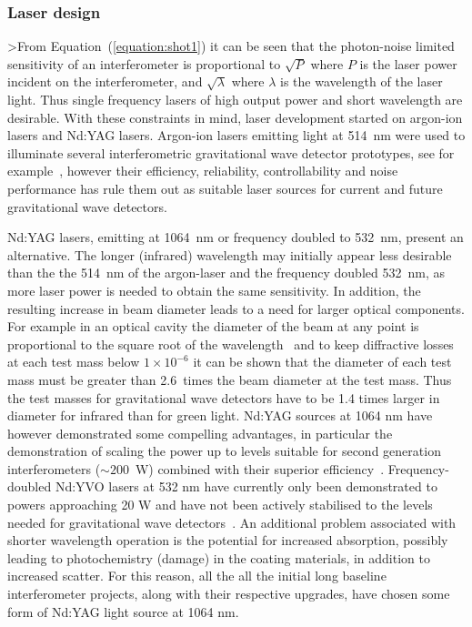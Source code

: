 \documentclass{article}
\begin{document}

\subsubsection{Laser design}
\label{subsubsection:laserdesign}

>From Equation~(\ref{equation:shot1}) it can be seen that the photon-noise
limited sensitivity of an interferometer is proportional to $\sqrt{P}$ where $P$
is the laser power incident on the interferometer, and $\sqrt{\lambda}$ where
$\lambda$ is the wavelength of the laser light. Thus single frequency lasers of
high output power and short wavelength are desirable. With these constraints in
mind, laser development started on argon-ion lasers and Nd:YAG lasers.
Argon-ion lasers emitting light at 514~nm were used to illuminate several
interferometric gravitational wave detector prototypes, see for
example~\cite{Shoemaker, Robertson}, however their efficiency, reliability,
controllability and noise performance has rule them out as suitable laser
sources for current and future gravitational wave detectors.

Nd:YAG lasers, emitting at 1064~nm or frequency doubled to 532~nm, present an
alternative. The longer (infrared) wavelength may initially appear less
desirable than the the 514~nm of the argon-laser and the frequency doubled
532~nm, as more laser power is needed to obtain the same sensitivity.  In
addition, the resulting increase in beam diameter leads to a need for larger
optical components. For example in an optical cavity the diameter of the beam at
any point is proportional to the square root of the wavelength~\cite{Kogelnik}
and to keep diffractive losses at each test mass below $1 \times 10^{-6}$ it can
be shown that the diameter of each test mass must be greater than 2.6~times the
beam diameter at the test mass. Thus the test masses for gravitational wave
detectors have to be 1.4 times larger in diameter for infrared than for green
light. Nd:YAG sources at 1064 nm have however demonstrated some compelling
advantages, in particular the demonstration of scaling the power up to levels
suitable for second generation interferometers ($\sim200$~W) combined with their
superior efficiency~\cite{Shine,Vogt,Kerr}. Frequency-doubled Nd:YVO lasers at
532 nm have currently only been demonstrated to powers approaching 20 W and have
not been actively stabilised to the levels needed for gravitational wave
detectors~\cite{Mavalvala:2010}. An additional problem associated with shorter
wavelength operation is the potential for increased absorption, possibly leading
to photochemistry (damage) in the coating materials, in addition to increased
scatter. For this reason, all the all the initial long baseline interferometer
projects, along with their respective upgrades, have chosen some form of Nd:YAG
light source at 1064 nm.
\end{document}
